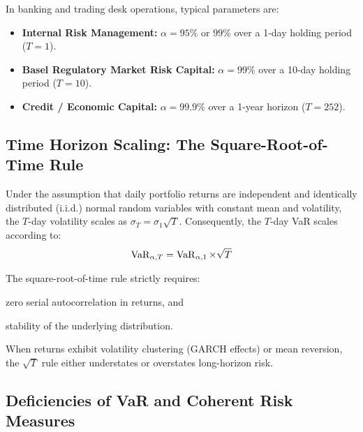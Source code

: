 In banking and trading desk operations, typical parameters are:
\begin{itemize}[leftmargin=1.5em, itemsep=2pt]
    \item \textbf{Internal Risk Management:} $\alpha = 95\%$ or $99\%$ over a 1-day holding period ($T = 1$).
    \item \textbf{Basel Regulatory Market Risk Capital:} $\alpha = 99\%$ over a 10-day holding period ($T = 10$).
    \item \textbf{Credit / Economic Capital:} $\alpha = 99.9\%$ over a 1-year horizon ($T = 252$).
\end{itemize}

\subsection{Time Horizon Scaling: The Square-Root-of-Time Rule}

Under the assumption that daily portfolio returns are independent and identically distributed (i.i.d.) normal random variables with constant mean and volatility, the $T$-day volatility scales as $\sigma_T = \sigma_1 \sqrt{T}$. Consequently, the $T$-day VaR scales according to:
\begin{equation}
\operatorname{VaR}_{\alpha, T} = \operatorname{VaR}_{\alpha, 1} \times \sqrt{T}
\end{equation}

\begin{remarkbox}
The square-root-of-time rule strictly requires:
\begin{enumerate*}[label=(\roman*)]
    \item zero serial autocorrelation in returns, and
    \item stability of the underlying distribution.
\end{enumerate*}
When returns exhibit volatility clustering (GARCH effects) or mean reversion, the $\sqrt{T}$ rule either understates or overstates long-horizon risk.
\end{remarkbox}

\subsection{Deficiencies of VaR and Coherent Risk Measures}

